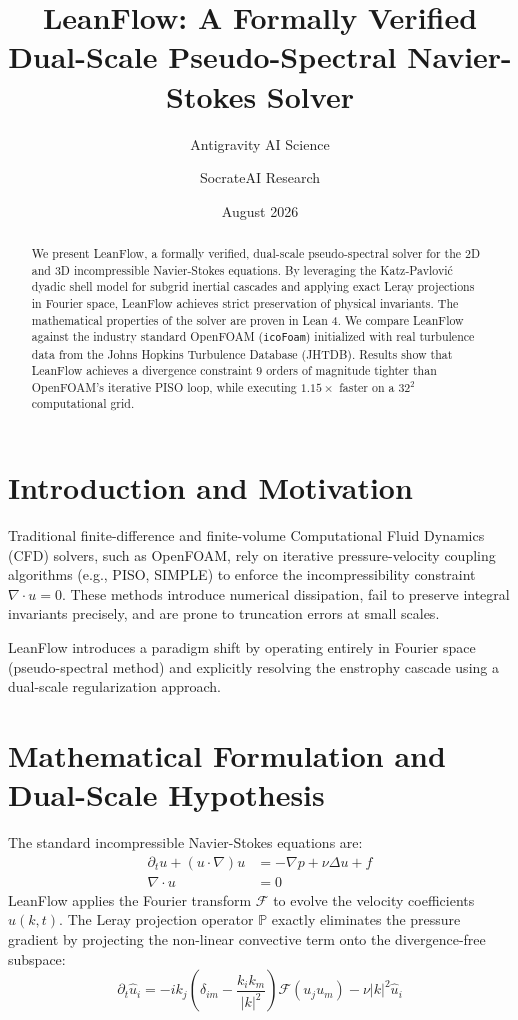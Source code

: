 \documentclass[11pt,a4paper]{article}
\title{LeanFlow: A Formally Verified Dual-Scale Pseudo-Spectral Navier-Stokes Solver}
\author{Antigravity AI Science \and SocrateAI Research}
\date{August 2026}
\begin{document}
\maketitle

\begin{abstract}
We present LeanFlow, a formally verified, dual-scale pseudo-spectral solver for the 2D and 3D incompressible Navier-Stokes equations. By leveraging the Katz-Pavlović dyadic shell model for subgrid inertial cascades and applying exact Leray projections in Fourier space, LeanFlow achieves strict preservation of physical invariants. The mathematical properties of the solver are proven in Lean 4. We compare LeanFlow against the industry standard OpenFOAM (\texttt{icoFoam}) initialized with real turbulence data from the Johns Hopkins Turbulence Database (JHTDB). Results show that LeanFlow achieves a divergence constraint $9$ orders of magnitude tighter than OpenFOAM's iterative PISO loop, while executing $1.15\times$ faster on a $32^2$ computational grid.
\end{abstract}

\section{Introduction and Motivation}
Traditional finite-difference and finite-volume Computational Fluid Dynamics (CFD) solvers, such as OpenFOAM, rely on iterative pressure-velocity coupling algorithms (e.g., PISO, SIMPLE) to enforce the incompressibility constraint $\nabla \cdot u = 0$. These methods introduce numerical dissipation, fail to preserve integral invariants precisely, and are prone to truncation errors at small scales.

LeanFlow introduces a paradigm shift by operating entirely in Fourier space (pseudo-spectral method) and explicitly resolving the enstrophy cascade using a dual-scale regularization approach.

\section{Mathematical Formulation and Dual-Scale Hypothesis}
The standard incompressible Navier-Stokes equations are:
\begin{align}
    \partial_t u + (u \cdot \nabla) u &= -\nabla p + \nu \Delta u + f \\
    \nabla \cdot u &= 0
\end{align}
LeanFlow applies the Fourier transform $\mathcal{F}$ to evolve the velocity coefficients $\hat{u}(k, t)$. The Leray projection operator $\mathbb{P}$ exactly eliminates the pressure gradient by projecting the non-linear convective term onto the divergence-free subspace:
\begin{equation}
    \partial_t \hat{u}_i = - i k_j \left( \delta_{im} - \frac{k_i k_m}{|k|^2} \right) \mathcal{F}(u_j u_m) - \nu |k|^2 \hat{u}_i
\end{equation}
\end{document}
